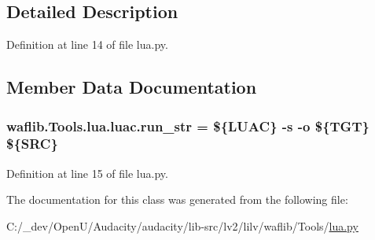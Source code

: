 \subsection{Detailed Description}


Definition at line 14 of file lua.\+py.



\subsection{Member Data Documentation}
\subsubsection[{\texorpdfstring{run\+\_\+str}{run_str}}]{ waflib.\+Tools.\+lua.\+luac.\+run\+\_\+str = \textquotesingle{}\$\{L\+U\+AC\} -\/{\bf s} -\/o \$\{T\+GT\} \$\{S\+RC\}\textquotesingle{}\hspace{0.3cm}{\ttfamily [static]}}\hypertarget{classwaflib_1_1_tools_1_1lua_1_1luac_ab701f4d53f79abc843ae006c23008c9a}{}\label{classwaflib_1_1_tools_1_1lua_1_1luac_ab701f4d53f79abc843ae006c23008c9a}


Definition at line 15 of file lua.\+py.



The documentation for this class was generated from the following file\+:\begin{DoxyCompactItemize}
\item 
C\+:/\+\_\+dev/\+Open\+U/\+Audacity/audacity/lib-\/src/lv2/lilv/waflib/\+Tools/\hyperlink{lilv_2waflib_2_tools_2lua_8py}{lua.\+py}\end{DoxyCompactItemize}
